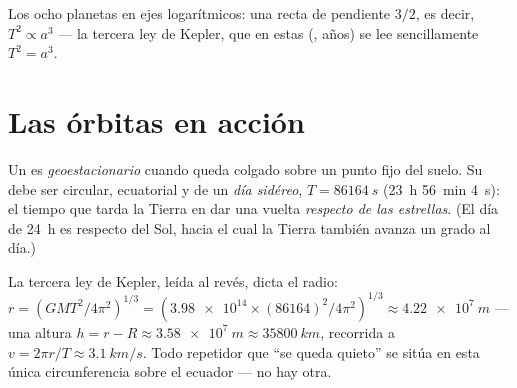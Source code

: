 \begin{omfigure}

{\small Los ocho planetas en ejes logarítmicos: una recta de pendiente $3/2$, es decir,
$T^2 \propto a^3$ --- la tercera ley de Kepler, que en estas  (, años) se lee sencillamente $T^2 = a^3$.}
\end{omfigure}

\section{Las órbitas en acción}

\begin{definition}\label{def:g12:satellites-kepler:geo}
Un  es \emph{geoestacionario} cuando queda
colgado sobre un punto fijo del suelo. Su  debe ser circular, ecuatorial y de
 un \emph{día sidéreo}, $T = \qty{86164}{s}$ (\qty{23}{h}
\qty{56}{min} \qty{4}{s}): el tiempo que tarda la Tierra en dar una vuelta
\emph{respecto de las estrellas}. (El día de \qty{24}{h} es respecto del Sol, hacia el
cual la Tierra también avanza un grado al día.)
\end{definition}

\begin{example}\label{ex:g12:satellites-kepler:geoalt}
La tercera ley de Kepler, leída al revés, dicta el radio:
$r = \left(GMT^2/4\pi^2\right)^{1/3} =
\left(\num{3.98e14} \times (\num{86164})^2/4\pi^2\right)^{1/3} \approx
\qty{4.22e7}{m}$ --- una altura $h = r - R \approx \qty{3.58e7}{m} \approx
\qty{35800}{km}$, recorrida a $v = 2\pi r/T \approx \qty{3.1}{km/s}$. Todo repetidor
que ``se queda quieto'' se sitúa en esta única circunferencia sobre el ecuador --- no
hay otra.
\end{example}

